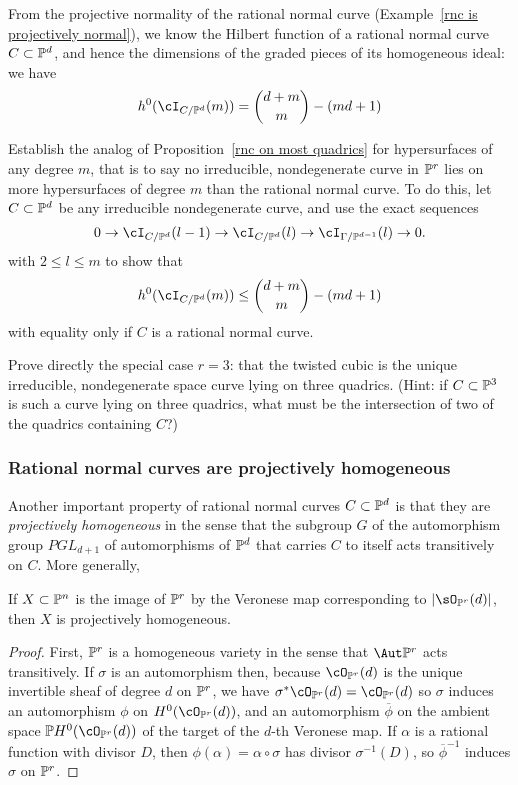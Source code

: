 From the projective normality of the rational normal curve (Example~\ref{rnc is projectively normal}), we know the Hilbert function of a rational normal curve $C \subset \PP^d$, and hence the dimensions of the graded pieces of its homogeneous ideal: we have
$$
h^0(\cI_{C/\PP^d}(m)) =  \binom{d+m}{m} - (md+1)
$$

\begin{exercise}
Establish the analog of Proposition~\ref{rnc on most quadrics} for hypersurfaces of any degree $m$, that is to say no irreducible, nondegenerate curve in $\PP^r$ lies on more hypersurfaces of degree $m$ than the rational normal curve.
To do this, let $C\subset \PP^d$ be any irreducible nondegenerate curve, and use the exact sequences
$$
0 \to \cI_{C/\PP^d}(l-1) \to \cI_{C/\PP^d}(l) \to \cI_{\Gamma/\PP^{d-1}}(l) \to 0.
$$ 
with $2 \leq l \leq m$ to show that
$$
h^0(\cI_{C/\PP^d}(m)) \leq  \binom{d+m}{m} - (md+1)
$$
with equality only if $C$ is a rational normal curve.
\end{exercise}

\begin{exercise}
Prove directly  the special case $r=3$: that the twisted cubic is the unique irreducible, nondegenerate space curve lying on three quadrics. (Hint: if $C \subset \PP^3$ is such a curve lying on three quadrics, what must be the intersection of two of the quadrics containing $C$?)
\end{exercise}

\subsubsection{Rational normal curves are projectively homogeneous}

Another important property of rational normal curves $C \subset \PP^d$ is that they are \emph{projectively homogeneous} in the sense that the subgroup $G$ of the automorphism group $PGL_{d+1}$ of automorphisms of $\PP^d$ that carries $C$ to itself acts transitively on $C$. More generally,

\begin{proposition}\label{Veronese is projectively homogeneous}
If $X\subset \PP^n$ is the image of $\PP^r$ by the Veronese map corresponding to $|\sO_{\PP^r}(d)|$, then $X$ is projectively homogeneous.
\end{proposition}
\begin{proof}
First, $\PP^r$ is a homogeneous variety in the sense that $\Aut \PP^r$ acts transitively. If $\sigma$ is an automorphism then,
 because $\cO_{\PP^r}(d)$ is the unique
invertible sheaf of degree $d$ on $\PP^r$,  we have $\sigma^*\cO_{\PP^r}(d) = \cO_{\PP^r}(d)$ so $\sigma$ induces an automorphism $\phi$ on $H^0(\cO_{\PP^r}(d))$, and an automorphism $\overline \phi$ on the ambient space $\PP H^0(\cO_{\PP^r}(d))$ of the target of the $d$-th Veronese map. If $\alpha$
is a rational function with divisor $D$, then $\phi(\alpha) = \alpha\circ \sigma$ has divisor $\sigma^{-1}(D)$, so $\overline\phi^{-1}$ induces $\sigma$ on $\PP^r$. 
\end{proof}

